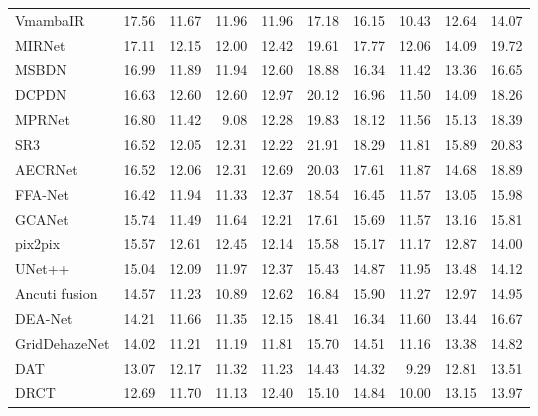 \begin{table}[p]
{\begin{tabular}{lrrrrrrrrr}
VmambaIR & 17.56 & 11.67 & 11.96 & 11.96 & 17.18 & 16.15 & 10.43 & 12.64 & 14.07 \\
MIRNet & 17.11 & 12.15 & 12.00 & 12.42 & 19.61 & 17.77 & 12.06 & 14.09 & 19.72 \\
MSBDN & 16.99 & 11.89 & 11.94 & 12.60 & 18.88 & 16.34 & 11.42 & 13.36 & 16.65 \\
DCPDN & 16.63 & 12.60 & 12.60 & 12.97 & 20.12 & 16.96 & 11.50 & 14.09 & 18.26 \\
MPRNet & 16.80 & 11.42 & 9.08 & 12.28 & 19.83 & 18.12 & 11.56 & 15.13 & 18.39 \\
SR3 & 16.52 & 12.05 & 12.31 & 12.22 & 21.91 & 18.29 & 11.81 & 15.89 & 20.83 \\
AECRNet & 16.52 & 12.06 & 12.31 & 12.69 & 20.03 & 17.61 & 11.87 & 14.68 & 18.89 \\
FFA-Net & 16.42 & 11.94 & 11.33 & 12.37 & 18.54 & 16.45 & 11.57 & 13.05 & 15.98 \\
GCANet & 15.74 & 11.49 & 11.64 & 12.21 & 17.61 & 15.69 & 11.57 & 13.16 & 15.81 \\
pix2pix & 15.57 & 12.61 & 12.45 & 12.14 & 15.58 & 15.17 & 11.17 & 12.87 & 14.00 \\
UNet++ & 15.04 & 12.09 & 11.97 & 12.37 & 15.43 & 14.87 & 11.95 & 13.48 & 14.12 \\
Ancuti fusion & 14.57 & 11.23 & 10.89 & 12.62 & 16.84 & 15.90 & 11.27 & 12.97 & 14.95 \\
DEA-Net & 14.21 & 11.66 & 11.35 & 12.15 & 18.41 & 16.34 & 11.60 & 13.44 & 16.67 \\
GridDehazeNet & 14.02 & 11.21 & 11.19 & 11.81 & 15.70 & 14.51 & 11.16 & 13.38 & 14.82 \\
DAT & 13.07 & 12.17 & 11.32 & 11.23 & 14.43 & 14.32 & 9.29 & 12.81 & 13.51 \\
DRCT & 12.69 & 11.70 & 11.13 & 12.40 & 15.10 & 14.84 & 10.00 & 13.15 & 13.97 \\
\bottomrule
\end{tabular}
}
\end{table}
